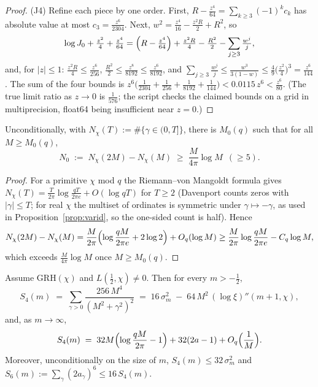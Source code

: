 \begin{proof}
(J4) Refine each piece by one order. First,
$R-\tfrac{z^4}{64}=\sum_{k\ge3}(-1)^kc_k$ has absolute value at most
$c_3=\tfrac{z^6}{2304}$. Next,
$w^2=\tfrac{z^4}{16}-\tfrac{z^2R}2+R^2$, so
\[
\log J_0+\tfrac{z^2}4+\tfrac{z^4}{64}
=\Bigl(R-\tfrac{z^4}{64}\Bigr)+\tfrac{z^2R}4-\tfrac{R^2}2
-\sum_{j\ge3}\tfrac{w^j}j ,
\]
and, for $|z|\le1$: $\tfrac{z^2R}4\le\tfrac{z^6}{256}$,
$\tfrac{R^2}2\le\tfrac{z^8}{8192}\le\tfrac{z^6}{8192}$, and
$\sum_{j\ge3}\tfrac{w^j}j\le\tfrac{w^3}{3(1-w)}
\le\tfrac49\bigl(\tfrac{z^2}4\bigr)^3=\tfrac{z^6}{144}$. The sum of
the four bounds is
$z^6\bigl(\tfrac1{2304}+\tfrac1{256}+\tfrac1{8192}+\tfrac1{144}\bigr)
<0.0115\,z^6<\tfrac{z^6}{80}$. (The true limit ratio as $z\to0$ is
$\tfrac1{576}$; the script checks the claimed bounds on a grid in
multiprecision, float64 being insufficient near $z=0$.)
\end{proof}

\begin{lemma}\label{lem:window}
Unconditionally, with
$N_\chi(T):=\#\{\gamma\in(0,T]\}$, there is $M_0(q)$ such that for all
$M\ge M_0(q)$,
\[
N_0\;:=\;N_\chi(2M)-N_\chi(M)\;\ge\;\frac{M}{4\pi}\log M
\;\ (\ge5).
\]
\end{lemma}

\begin{proof}
For a primitive $\chi$ mod $q$ the Riemann--von Mangoldt formula gives
$N_\chi(T)=\frac{T}{2\pi}\log\frac{qT}{2\pi e}+O(\log qT)$ for
$T\ge2$ \cite[\S16]{Dav00} (Davenport counts zeros with $|\gamma|\le
T$; for real $\chi$ the multiset of ordinates is symmetric under
$\gamma\mapsto-\gamma$, as used in Proposition~\ref{prop:varid}, so
the one-sided count is half). Hence
\[
N_\chi(2M)-N_\chi(M)
=\frac{M}{2\pi}\Bigl(\log\frac{qM}{2\pi e}+2\log2\Bigr)+O_q(\log M)
\ge\frac{M}{2\pi}\log\frac{qM}{2\pi e}-C_q\log M ,
\]
which exceeds $\frac{M}{4\pi}\log M$ once $M\ge M_0(q)$.
\end{proof}

\begin{lemma}\label{lem:S4mom}
Assume GRH$(\chi)$ and $L(\tfrac12,\chi)\ne0$. Then for every
$m>-\tfrac12$,
\begin{equation}\label{eq:S4id}
S_4(m)\;=\;\sum_{\gamma>0}\frac{256\,M^4}{(M^2+\gamma^2)^2}
\;=\;16\,\sigma_m^2\;-\;64\,M^2\,(\log\xi)''(m+1,\chi),
\end{equation}
and, as $m\to\infty$,
\begin{equation}\label{eq:S4asymp}
S_4(m)\;=\;32M\Bigl(\log\frac{qM}{2\pi}-1\Bigr)+32(2a-1)
+O_q\Bigl(\frac1M\Bigr).
\end{equation}
Moreover, unconditionally on the size of $m$,
$S_4(m)\le32\,\sigma_m^2$ and
$S_6(m):=\sum_\gamma(2a_\gamma)^6\le16\,S_4(m)$.
\end{lemma}

